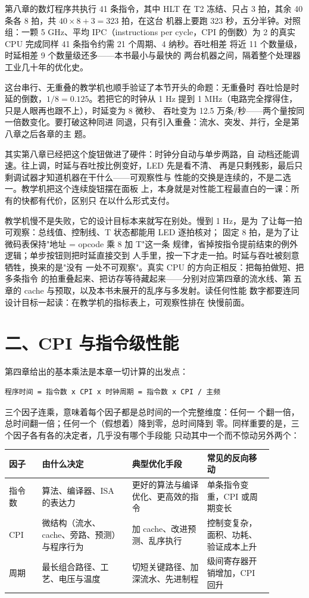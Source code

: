 第八章的数灯程序共执行 41 条指令，其中 HLT 在 T2 冻结、只占 3 拍，其余 40 条各 8 拍，共 $40\times8+3=323$ 拍，在这台
机器上要跑 323 秒，五分半钟。对照组：一颗 5 GHz、平均 IPC（instructions per cycle，CPI 的倒数）为 2
的真实 CPU 完成同样 41 条指令约需 21 个周期、4 纳秒。吞吐相差
将近 11 个数量级，时延相差 9 个数量级还多——本书最小与最快的
两台机器之间，隔着整个处理器工业几十年的优化史。

这台串行、无重叠的教学机也顺手验证了本节开头的命题：无重叠时
吞吐恰是时延的倒数，$1/8=0.125$。若把它的时钟从 1 Hz 提到 1
MHz（电路完全撑得住，只是人眼再也跟不上），时延变为 8 微秒、
吞吐变为 12.5 万条/秒——两个量按同一倍数变化。要打破这种同进
同退，只有引入重叠：流水、突发、并行，全是第八章之后各章的主
题。

其实第八章已经把这个旋钮做进了硬件：时钟分自动与单步两路，自
动档还能调速。往上调，时延与吞吐按比例变好，LED 先是看不清、
再是只剩残影，最后只剩调试器才知道机器在干什么——可观察性与
性能的交换是连续的，不是二选一。教学机把这个连续旋钮摆在面板
上，本身就是对性能工程最直白的一课：所有的快都有代价，区别只
在以什么形式支付。

教学机慢不是失败，它的设计目标本来就写在别处。慢到 1 Hz，是为
了让每一拍可观察：总线值、控制线、T 状态都能用 LED 逐拍核对；
固定 8 拍，是为了让微码表保持"地址 = opcode 乘 8 加 T"这一条
规律，省掉按指令提前结束的例外逻辑；单步按钮则把时延直接交到
人手里，按一下才走一拍。时延与吞吐被刻意牺牲，换来的是"没有
一处不可观察"。真实 CPU 的方向正相反：把每拍做短、把多条指令
的拍重叠起来、把访存等待藏起来——分别对应第四章的流水线、第
五章的 cache 与预取，以及本书未展开的乱序与多发射。读任何性能
数字都要连同设计目标一起读：在教学机的指标表上，可观察性排在
快慢前面。

\section{二、CPI 与指令级性能}

第四章给出的基本乘法是本章一切计算的出发点：

\begin{lstlisting}
程序时间 = 指令数 x CPI x 时钟周期 = 指令数 x CPI / 主频
\end{lstlisting}

三个因子连乘，意味着每个因子都是总时间的一个完整维度：任何一
个翻一倍，总时间翻一倍；任何一个（假想着）降到零，总时间降到
零。同样重要的是，三个因子各有各的决定者，几乎没有哪个手段能
只动其中一个而不惊动另外两个：

\begin{longtable}{L{0.11\linewidth}L{0.3\linewidth}L{0.25\linewidth}L{0.22\linewidth}}
\toprule
因子 & 由什么决定 & 典型优化手段 & 常见的反向移动 \\
\midrule
指令数 & 算法、编译器、ISA 的表达力 & 更好的算法与编译优化、更高效的指令 & 单条指令变重，CPI 或周期变长 \\
CPI & 微结构（流水、cache、旁路、预测）与程序行为 & 加 cache、改进预测、乱序执行 & 控制变复杂，面积、功耗、验证成本上升 \\
周期 & 最长组合路径、工艺、电压与温度 & 切短关键路径、加深流水、先进制程 & 级间寄存器开销增加，CPI 回升 \\
\bottomrule
\end{longtable}

